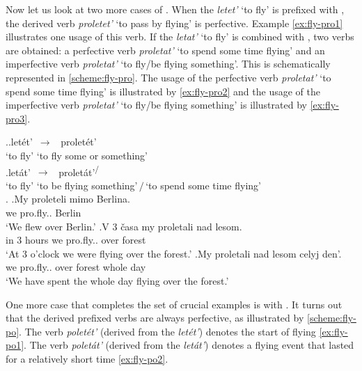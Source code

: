 Now let us look at two more cases of . When the  \textit{letet'}\textsuperscript{\IPF} `to fly' is prefixed with , the derived verb \textit{proletet'}\textsuperscript{\PF} `to pass by flying' is perfective. Example \ref{ex:fly-pro1} illustrates one usage of this verb. If the  \textit{letat'}\textsuperscript{\IPF} `to fly' is combined with , two verbs are obtained: a perfective verb \textit{proletat'}\textsuperscript{\PF} `to spend some time flying' and an imperfective verb \textit{proletat'}\textsuperscript{\IPF} `to fly/be flying  something'.  This is schematically represented in \ref{scheme:fly-pro}. The usage of the perfective verb \textit{proletat'}\textsuperscript{\PF} `to spend some time flying' is illustrated by \ref{ex:fly-pro2} and the usage of the imperfective verb \textit{proletat'}\textsuperscript{\IPF} `to fly/be flying  something' is illustrated by \ref{ex:fly-pro3}. 

\ex.\label{scheme:fly-pro}\ag.let\'{e}t'\textsuperscript{\IPF}~$\to$~ prolet\'{e}t'\textsuperscript{\PF}\\
{`to fly'} {`to fly some  or  something'}\\
\bg.let\'{a}t'\textsuperscript{\IPF}~$\to$~ prolet\'{a}t'\textsuperscript{\IPF\slash\PF}\\
{`to fly'} {`to be flying  something'\,$/$\,`to spend some time flying'}\\

\ex.\label{ex:fly-pro}
\ag.\label{ex:fly-pro1}My proleteli\textsuperscript{\PF} mimo Berlina.\\
we pro.fly..  Berlin\\
\trans `We flew over Berlin.'
\bg.\label{ex:fly-pro2}V 3 \v{c}asa my proletali\textsuperscript{\IPF} nad lesom.\\
in 3 hours we pro.fly.. over forest\\
\trans `At 3 o'clock we were flying over the forest.'
\bg.\label{ex:fly-pro3}My proletali\textsuperscript{\PF} nad lesom celyj den'.\\
we pro.fly.. over forest whole day\\
\trans `We have spent the whole day flying over the forest.'

One more case that completes the set of crucial examples is  with . It turns out that the derived prefixed verbs are always perfective, as illustrated by \ref{scheme:fly-po}. The verb \textit{polet\'{e}t'\textsuperscript{\PF}} (derived from the  \textit{let\'{e}t'\textsuperscript{\IPF}}) denotes the start of flying \ref{ex:fly-po1}. The verb \textit{polet\'{a}t'\textsuperscript{\PF}} (derived from the  \textit{let\'{a}t'\textsuperscript{\IPF}}) denotes a flying event that lasted for a relatively short time \ref{ex:fly-po2}.

